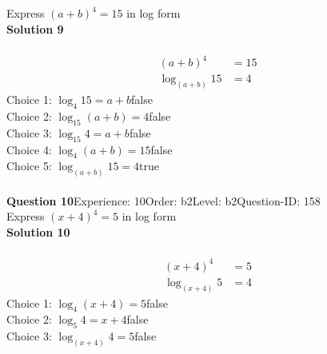 \documentclass{article}
\begin{document}
Express $(a+b)^4=15$ in log form\\[4pt]
\noindent\textbf{Solution 9}\\[2pt]
\\[-35pt]\begin{align*}
(a+b)^4&=15\\[2pt]
\log_{(a+b)}15&=4
\end{align*}
Choice 1: \hspace{20pt}$\log_{4}15=a+b$\hspace{20pt}false\\
Choice 2: \hspace{20pt}$\log_{15}(a+b)=4$\hspace{20pt}false\\
Choice 3: \hspace{20pt}$\log_{15}4=a+b$\hspace{20pt}false\\
Choice 4: \hspace{20pt}$\log_{4}(a+b)=15$\hspace{20pt}false\\
Choice 5: \hspace{20pt}$\log_{(a+b)}15=4$\hspace{20pt}true\\
\\[4pt]
\noindent\textbf{Question 10}\hspace{20pt}Experience: 10\hspace{20pt}Order: b2\hspace{20pt}Level: b2\hspace{20pt}Question-ID: 158\\[2pt]
Express $(x+4)^4=5$ in log form\\[4pt]
\noindent\textbf{Solution 10}\\[2pt]
\\[-35pt]\begin{align*}
(x+4)^4&=5\\[2pt]
\log_{(x+4)}5&=4
\end{align*}
Choice 1: \hspace{20pt}$\log_{4}(x+4)=5$\hspace{20pt}false\\
Choice 2: \hspace{20pt}$\log_{5}4=x+4$\hspace{20pt}false\\
Choice 3: \hspace{20pt}$\log_{(x+4)}4=5$\hspace{20pt}false\\
\end{document}
